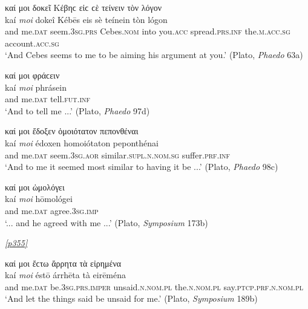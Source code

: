 \begin{exe}
\ex καί μοι δοκεῖ Κέβηϲ εἰϲ ϲὲ τείνειν τὸν λόγον\\
\gll kaí \emph{moi} dokeî Kébēs eis sè teínein tòn lógon\\
and me.\textsc{dat} seem.\textsc{3sg.prs} Cebes.\textsc{nom} into
you.\textsc{acc} spread.\textsc{prs.inf} the.\textsc{m.acc.sg}
account.\textsc{acc.sg}\\
\trans `And Cebes seems to me to be aiming his argument at you.' (Plato, \textit{Phaedo} 63a)\\
\label{kaimoi41}
\end{exe}

\begin{exe}
\ex καί μοι φράϲειν\\
\gll kaí \emph{moi} phrásein\\
and me.\textsc{dat} tell.\textsc{fut.inf}\\
`And to tell me ...' \trans (Plato, \textit{Phaedo} 97d)
\label{kaimoi42}
\end{exe}

\begin{exe}
\ex καί μοι ἔδοξεν ὁμοιότατον πεπονθέναι\\
\gll kaí \emph{moi} édoxen homoiótaton peponthénai\\
and me.\textsc{dat} seem.\textsc{3sg.aor} similar.\textsc{supl.n.nom.sg} suffer.\textsc{prf.inf}\\
\trans `And to me it seemed most similar to having it be ...' (Plato, \textit{Phaedo} 98c)
\label{kaimoi43}
\end{exe}

\largerpage
\begin{exe}
\ex καί μοι ὡμολόγει\\
\gll kaí \emph{moi} hōmológei\\
and me.\textsc{dat} agree.\textsc{3sg.imp}\\
\trans `... and he agreed with me ...' (Plato, \textit{Symposium} 173b)
\label{kaimoi44}
\end{exe}

\hyperlink{p355}{\emph{[p355]}}

\begin{exe}
\ex καί μοι ἔϲτω ἄρρητα τὰ εἰρημένα\\
\gll kaí \emph{moi} éstō árrhēta tà eirēména\\
and me.\textsc{dat} be.\textsc{3sg.prs.imper} unsaid.\textsc{n.nom.pl}
the.\textsc{n.nom.pl} say.\textsc{ptcp.prf.n.nom.pl}\\
\trans `And let the things said be unsaid for me.' (Plato, \textit{Symposium} 189b)
\label{kaimoi45}
\end{exe}


